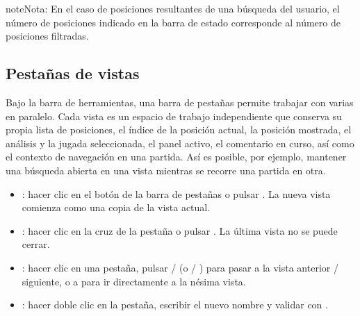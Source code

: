 \documentclass[letterpaper,10pt,spanish]{sphinxmanual}
\begin{document}
\begin{sphinxadmonition}{note}{Nota:}
\sphinxAtStartPar
En el caso de posiciones resultantes de una búsqueda del usuario, el número de posiciones indicado en la barra de estado corresponde al número de posiciones filtradas.
\end{sphinxadmonition}


\subsection{Pestañas de vistas}
\label{\detokenize{manuel:onglets-de-vues}}\label{\detokenize{manuel:onglets-vues}}
\sphinxAtStartPar
Bajo la barra de herramientas, una barra de pestañas permite trabajar con varias  en paralelo. Cada vista es un espacio de trabajo independiente que conserva su propia lista de posiciones, el índice de la posición actual, la posición mostrada, el análisis y la jugada seleccionada, el panel activo, el comentario en curso, así como el contexto de navegación en una partida. Así es posible, por ejemplo, mantener una búsqueda abierta en una vista mientras se recorre una partida en otra.
\begin{itemize}
\item {} 
\sphinxAtStartPar
{}: hacer clic en el botón \sphinxstyleemphasis{+} de la barra de pestañas o pulsar . La nueva vista comienza como una copia de la vista actual.

\item {} 
\sphinxAtStartPar
{}: hacer clic en la cruz de la pestaña o pulsar . La última vista no se puede cerrar.

\item {} 
\sphinxAtStartPar
{}: hacer clic en una pestaña, pulsar  /  (o  / ) para pasar a la vista anterior / siguiente, o  a  para ir directamente a la n\sphinxhyphen{}ésima vista.

\item {} 
\sphinxAtStartPar
{}: hacer doble clic en la pestaña, escribir el nuevo nombre y validar con .

\end{itemize}
\end{document}
